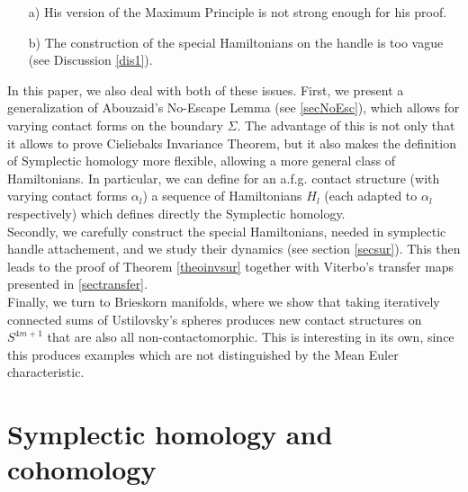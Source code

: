 \documentclass[a4paper,12pt,bibliography=totocnumbered,titlepage=false,abstracton,bookmarksnumbered=true]{scrartcl}
\theoremstyle{definition}
\begin{document}
\begin{enumerate}
 \item[a)] His version of the Maximum Principle is not strong enough for his proof.
 \item[b)] The construction of the special Hamiltonians on the handle is too vague (see Discussion \ref{dis1}).
\end{enumerate}
In this paper, we also deal with both of these issues. First, we present a generalization of Abouzaid's No-Escape Lemma (see \ref{secNoEsc}), which allows for varying contact forms on the boundary $\Sigma$. The advantage  of this is not only that it allows to prove Cieliebaks Invariance Theorem, but it also makes the definition of Symplectic homology  more flexible, allowing a more general class of Hamiltonians. In particular, we can define for an a.f.g. contact structure (with varying contact forms $\alpha_l$) a sequence of Hamiltonians $H_l$ (each adapted to $\alpha_l$ respectively) which defines directly the Symplectic homology.\\
Secondly, we carefully construct the special Hamiltonians, needed in symplectic handle attachement, and we study their dynamics (see section \ref{secsur}). This then leads to the proof of Theorem \ref{theoinvsur} together with Viterbo's transfer maps presented in \ref{sectransfer}.\\
Finally, we turn to Brieskorn manifolds, where we show that taking iteratively connected sums of Ustilovsky's spheres produces new contact structures on $S^{4m+1}$ that are also all non-contactomorphic. This is interesting in its own, since this produces examples which are not distinguished by the Mean Euler characteristic.

\section{Symplectic homology and cohomology}
\end{document}
